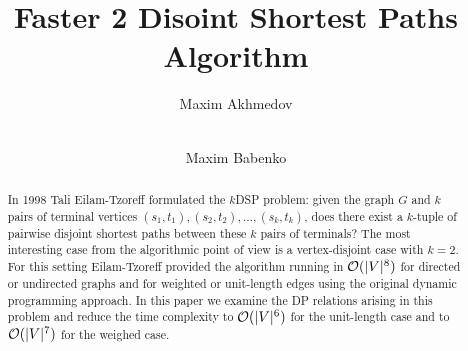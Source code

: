 \title{Faster 2 Disoint Shortest Paths Algorithm}

\author{Maxim Akhmedov \and \\
Maxim Babenko}


\maketitle

\begin{abstract}
In 1998 Tali Eilam-Tzoreff formulated the $k$DSP problem: given the graph $G$ and $k$ pairs of terminal vertices $(s_1, t_1), (s_2, t_2), \ldots, (s_k, t_k)$, does there exist a $k$-tuple of pairwise disjoint shortest paths between these $k$ pairs of terminals? The most interesting case from the algorithmic point of view is a vertex-disjoint case with $k=2$. For this setting Eilam-Tzoreff provided the algorithm running in $\mathcal{O}(|V|^8)$ for directed or undirected graphs and for weighted or unit-length edges using the original dynamic programming approach. In this paper we examine the DP relations arising in this problem and reduce the time complexity to $\mathcal{O}(|V|^6)$ for the unit-length case and to $\mathcal{O}(|V|^7)$ for the weighed case.

\end{abstract}

